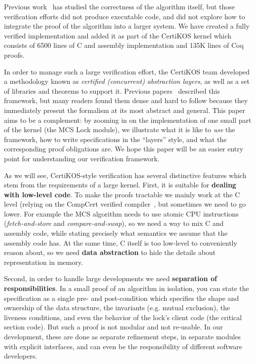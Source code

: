 Previous work~\cite{lili16,ogata:mcs-lock} has studied the
correctness of the algorithm itself, but those verification efforts
did not produce executable code, and did not explore how to integrate
the proof of the algorithm into a larger system. We have created a
fully verified implementation and added it as part of the CertiKOS
kernel  which consists of 6500 lines of C and
assembly implementation and 135K lines of Coq proofs.

In order to manage such a large verification effort, the CertiKOS team developed a methodology known as \emph{certified (concurrent) abstraction layers}, as well as a set of libraries and theorems to support it. Previous papers~\cite{deepspec}
described this framework, but many readers found them  dense and hard to follow because they immediately present the formalism at its most abstract and general.
This paper aims to be a complement: by zooming in on the implementation of one small part of the kernel (the MCS Lock module), we illustrate  what it is like to \emph{use} the framework, how to write specifications in the ``layers'' style, and what the corresponding proof obligations are. We hope this paper will be an easier entry point for understanding our verification framework.

As we will see, CertiKOS-style verification has several distinctive features which stem from the requirements of a large kernel. First, it is suitable for {\bf dealing with low-level code}. To make the proofs tractable we mainly work at the C level (relying on the CompCert verified compiler~\cite{compcert}, but sometimes we need to go lower. For example the MCS algorithm needs to use atomic CPU instructions ({\em fetch-and-store} and {\em compare-and-swap}), so we need a way to  mix C and assembly code, while stating precisely what semantics we assume that the assembly code has. At the same time, C itself is too low-level to conveniently reason about, so we need {\bf data abstraction} to hide the details about representation in memory.

Second, in order to handle large developments we need {\bf separation of responsibilities}. In a small proof of an algorithm in isolation, you can state the specification as a single pre- and post-condition which specifies the shape and ownership of the data structure, the invariants (e.g. mutual exclusion), the liveness conditions, and even the behavior of the lock's client code (the critical section code). But such a proof is not modular and not re-usable. In our development, these are done as separate refinement steps, in separate modules with explicit interfaces, and can even be the responsibility of different software developers. 

